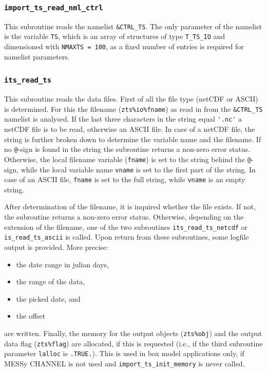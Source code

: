 \documentclass[11pt,twoside]{report}
\begin{document}
\subsubsection{\color{blue} \tt\bf  import\_ts\_read\_nml\_ctrl\label{ITSreadctrl}}
This subroutine reads the namelist \verb|&CTRL_TS|. The only parameter of the
namelist is the variable \verb|TS|, which is an array of structures of 
type \verb|T_TS_IO| and 
dimensioned with \verb|NMAXTS = 100|, as  a fixed number of entries is
required for namelist parameters.
\subsubsection{\color{blue} \tt\bf  its\_read\_ts\label{ITSread}}
This subroutine reads the data files. 
First of all the file type (netCDF or ASCII) is determined.
For this the filename (\verb|zts%io%fname|) as read in from the 
\verb|&CTRL_TS| namelist is analysed. If the last three characters in the
string equal \verb|'.nc'| a netCDF file is to be read, otherwise an ASCII file.
In case of a netCDF file, the string is further broken down to
determine the variable name and the filename. If no \verb|@|-sign is
found in the string the subroutine returns a non-zero error status.
Otherwise, the local filename variable (\verb|fname|)
 is set to the string behind the \verb|@|-sign, while the local variable name 
\verb|vname| is set to the first part of the string. 
In case of an ASCII file, \verb|fname| is set to the full string, while 
\verb|vname| is an empty string.

After determination of the filename, it is inquired whether the file exists.
If not, the subroutine returns a non-zero error status.
Otherwise, depending on the extension of the filename, one of the two subroutines
\verb|its_read_ts_netcdf| or \verb|is_read_ts_ascii| is called.
Upon return from these subroutines, some logfile output is provided. More precise:
\begin{itemize}
\item the date range in julian days,
\item  the range of the data,
\item  the picked date, and 
\item the offset
\end{itemize}
are written. Finally, the memory for the output objects (\verb|zts%obj|) and 
the output data flag (\verb|zts%flag|) are allocated, 
if this is requested (i.e., if the third subroutine
parameter \verb|lalloc| is \verb|.TRUE.|). 
This is used in box model applications only, if MESSy CHANNEL
is not used and \verb|import_ts_init_memory| is never called.
\end{document}
